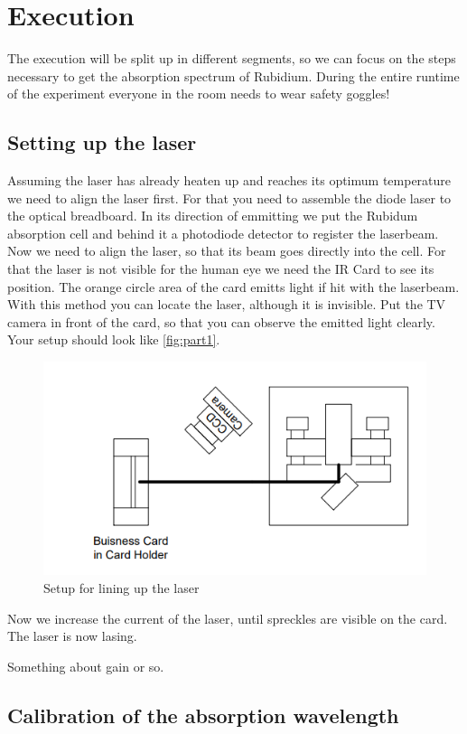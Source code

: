 \section{Execution}
\label{sec:Execution}

The execution will be split up in different segments, so we can focus on the steps necessary to get the absorption spectrum of Rubidium.
During the entire runtime of the experiment everyone in the room needs to wear safety goggles!

\subsection{Setting up the laser}
\label{ssec:exe1}

Assuming the laser has already heaten up and reaches its optimum temperature we need to align the laser first.
For that you need to assemble the diode laser to the optical breadboard.
In its direction of emmitting we put the Rubidum absorption cell and behind it a photodiode detector to register the laserbeam.
Now we need to align the laser, so that its beam goes directly into the cell.
For that the laser is not visible for the human eye we need the IR Card to see its position. 
The orange circle area of the card emitts light if hit with the laserbeam. 
With this method you can locate the laser, although it is invisible.
Put the TV camera in front of the card, so that you can observe the emitted light clearly.
Your setup should look like \autoref{fig:part1}.
\begin{figure}
    \centering
    \includegraphics[width=\textwidth]{images/part1.png}
    \caption{Setup for lining up the laser \cite{V60}}
    \label{fig:part1}
\end{figure}
Now we increase the current of the laser, until spreckles are visible on the card. 
The laser is now lasing. 

Something about gain or so.

\subsection{Calibration of the absorption wavelength}
\label{ssec:exe2}

